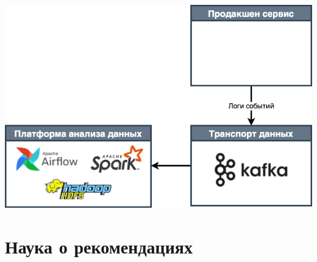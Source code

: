 \documentclass[11pt,aspectratio=169,handout]{beamer}
\begin{document}
\begin{frame}{}

\begin{center}
\includegraphics[scale=0.35]{images/bigdata.png}
\end{center}

\end{frame}

{
\begin{frame}[plain]
\end{frame}
}

\section{Наука о рекомендациях}

{
\begin{frame}[plain]
\end{frame}
}
\end{document}
